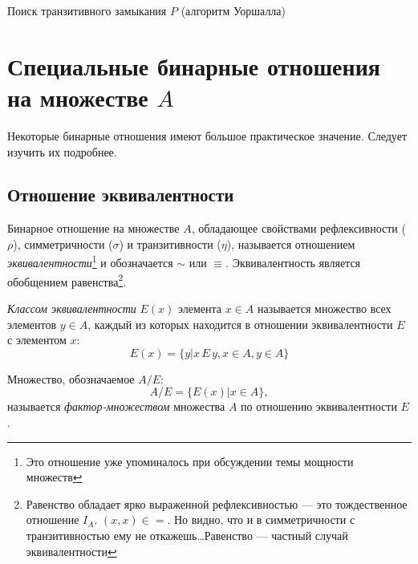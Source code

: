 \begin{algorithm}
    \caption{Поиск транзитивного замыкания $P$ (алгоритм Уоршалла)}\label{alg:bo:warshall}
    \begin{algorithmic}[1]
        \STATE{$[T]\gets [P]$}
                \ENDFOR
            \ENDFOR
        \ENDFOR
    \end{algorithmic}
\end{algorithm}
    
    
\section{Специальные бинарные отношения на множестве $A$}

Некоторые бинарные отношения имеют большое практическое значение. Следует изучить их подробнее.


\subsection{Отношение эквивалентности}
 

Бинарное отношение на множестве $A$, обладающее свойствами рефлексивности ($\rho$), симметричности ($\sigma$) и транзитивности ($\eta$), называется отношением \emph{эквивалентности}\footnote{Это отношение уже упоминалось при обсуждении темы мощности множеств} и обозначается $\sim$ или $\equiv$. Эквивалентность является  обобщением равенства\footnote{Равенство обладает ярко выраженной рефлексивностью --- это тождественное отношение $I_A$. $(x,x)\in =$. Но видно, что и в симметричности с транзитивностью ему не откажешь\ldots Равенство --- частный случай эквивалентности}.

\emph{Классом эквивалентности} $E(x)$ элемента $x\in A$ называется множество всех элементов $y\in A$, каждый из которых находится в отношении эквивалентности $E$ с элементом $x$:
\[E(x)=\{y|x\,E\,y, x\in A, y\in A\}\]

Множество, обозначаемое $A/E$:
\[
    A/E=\{E(x)|x\in A\},
\]
называется \emph{фактор-множеством} множества $A$ по отношению эквивалентности $E$.

